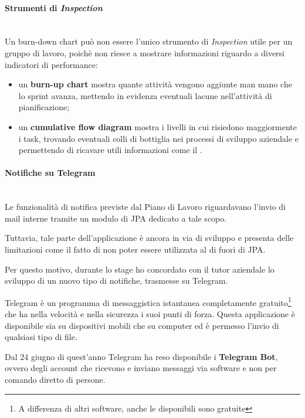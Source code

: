 \paragraph{Strumenti di \emph{Inspection}} \mbox{} \\

Un burn-down chart può non essere l'unico strumento di \emph{Inspection} utile
per un gruppo di lavoro, poichè non riesce a mostrare informazioni riguardo a
diversi indicatori di performance:

\begin{itemize}
\item un \textbf{burn-up chart} mostra quante attività vengono aggiunte man
  mano che lo sprint avanza, mettendo in evidenza eventuali lacune
  nell'attività di pianificazione;
\item un \textbf{cumulative flow diagram} mostra i livelli in cui risiedono
  maggiormente i task, trovando eventuali colli di bottiglia nei processi di
  sviluppo aziendale e permettendo di ricavare utili informazioni come il
  .
\end{itemize}

\paragraph{Notifiche su Telegram} \mbox{} \\

Le funzionalità di notifica previste dal Piano di Lavoro riguardavano l'invio
di mail interne tramite un modulo di JPA dedicato a tale scopo.

Tuttavia, tale parte dell'applicazione è ancora in via di sviluppo e presenta
delle limitazioni come il fatto di non poter essere utilizzata al di fuori di
JPA.

Per questo motivo, durante lo stage ho concordato con il tutor aziendale lo
sviluppo di un nuovo tipo di notifiche, trasmesse su Telegram.

Telegram è un programma di messaggistica istantanea completamente
gratuito\footnote{A differenza di altri software, anche le 
disponibili sono gratuite} che ha nella velocità e nella sicurezza i suoi
punti di forza. Questa applicazione è disponibile sia su dispositivi mobili
che su computer ed è permesso l'invio di qualsiasi tipo di file.

Dal 24 giugno di quest'anno Telegram ha reso disponibile i \textbf{Telegram
Bot}, ovvero degli account che ricevono e inviano messaggi via software e non
per comando diretto di persone.

